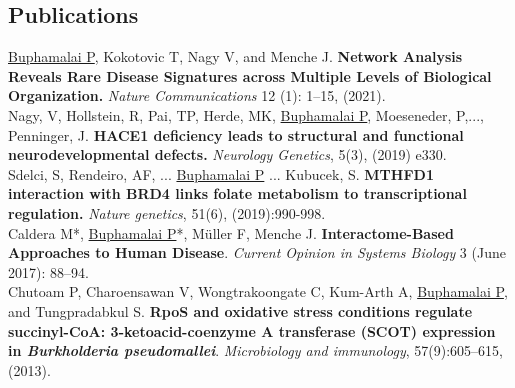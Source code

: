 \documentclass[margin,line]{resume}
\begin{document}
\begin{resume}
  \vspace{-2mm}

  \section{\mysidestyle Publications}
  \underline{Buphamalai P}, Kokotovic T, Nagy V, and Menche J. \textbf{Network Analysis Reveals Rare Disease Signatures across Multiple Levels of Biological Organization.} \textit{Nature Communications} 12 (1): 1–15, (2021).\vspace{2mm}\\
  Nagy, V, Hollstein, R, Pai, TP, Herde, MK, \underline{Buphamalai P}, Moeseneder, P,..., Penninger, J. \textbf{HACE1 deficiency leads to structural and functional neurodevelopmental defects.} \textit{Neurology Genetics}, 5(3), (2019) e330.\vspace{2mm}\\
  Sdelci, S, Rendeiro, AF, ... \underline{Buphamalai P} ... Kubucek, S. \textbf{MTHFD1 interaction with BRD4 links folate metabolism to transcriptional regulation.} \textit{Nature genetics}, 51(6), (2019):990-998.\vspace{2mm}\\
   Caldera M*,  \underline{Buphamalai P}*, M{\"u}ller F, Menche J. \textbf{Interactome-Based Approaches to Human Disease}. \textit{Current Opinion in Systems Biology} 3 (June 2017): 88–94. \vspace{2mm}\\
   Chutoam P, Charoensawan V, Wongtrakoongate C, Kum-Arth A,  \underline{Buphamalai P}, and Tungpradabkul S. \textbf{RpoS and oxidative stress conditions regulate succinyl-CoA: 3-ketoacid-coenzyme A transferase (SCOT) expression in \textit{Burkholderia pseudomallei}}. \textit{Microbiology and immunology}, 57(9):605--615, (2013).
   

\end{resume}
\end{document}
